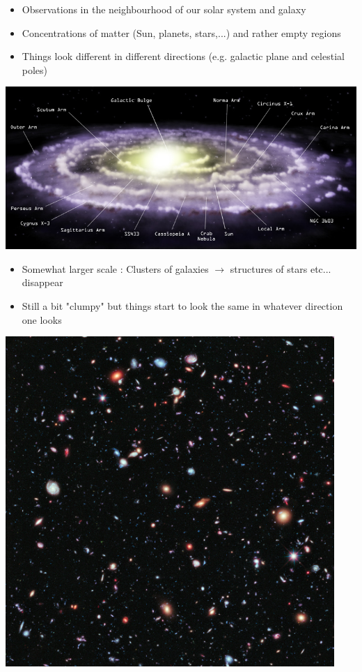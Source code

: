\onecolumn
\begin{itemize}
\item Observations in the neighbourhood of our solar system and galaxy
\item[] Concentrations of matter (Sun, planets, stars,...) and  rather empty regions
\item[] Things look different in different directions (e.g. galactic plane and celestial poles)
\end{itemize}
%
\begin{center}
\includegraphics[keepaspectratio,width=25cm]{milky-way}
\end{center}

\Tr
\onecolumn
\begin{itemize}
\item Somewhat larger scale : Clusters of galaxies $\rightarrow$ structures of stars etc... disappear
\item[] Still a bit "clumpy" but things start to look the same in whatever direction one looks
\end{itemize}
%
\begin{center}
\includegraphics[keepaspectratio,height=12.5cm]{galaxies}
\end{center}

